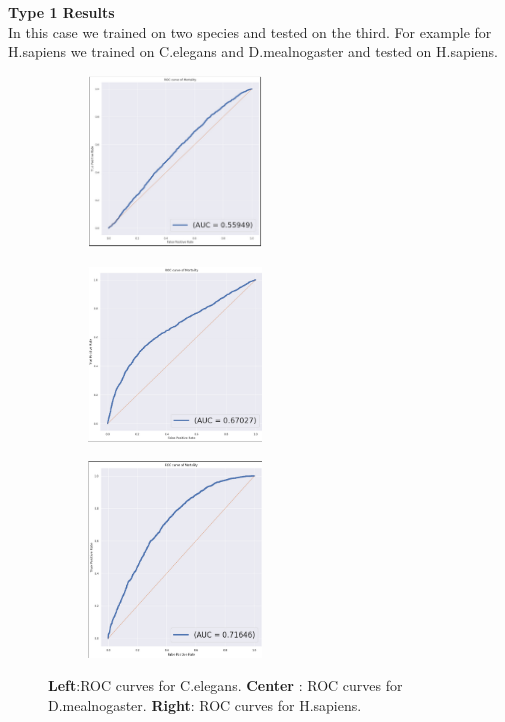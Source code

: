 \documentclass{article}
\begin{document}
\textbf{Type 1 Results} \\
In this case we trained on two species and tested on the third. For example for H.sapiens we trained on C.elegans and D.mealnogaster
and tested on  H.sapiens. \\

\begin{figure}[]
  \centering
  \begin{subfigure}{4.6cm}
    \centering\includegraphics[width=4.6cm]{C_elegans.png}
  \end{subfigure}
  \begin{subfigure}{4.6cm}
    \centering\includegraphics[width=4.6cm]{D.mealnogaster.png}
  \end{subfigure}
  \begin{subfigure}{4.6cm}
    \centering\includegraphics[width=4.6cm]{sapiens.png}
  \end{subfigure}
  \caption{ 
  \textbf{Left}:ROC curves for  C.elegans.
  \textbf{Center} : ROC curves for  D.mealnogaster.
  \textbf{Right}: ROC curves for  H.sapiens.}
  \label{fig:ROC}
\end{figure}
\end{document}
